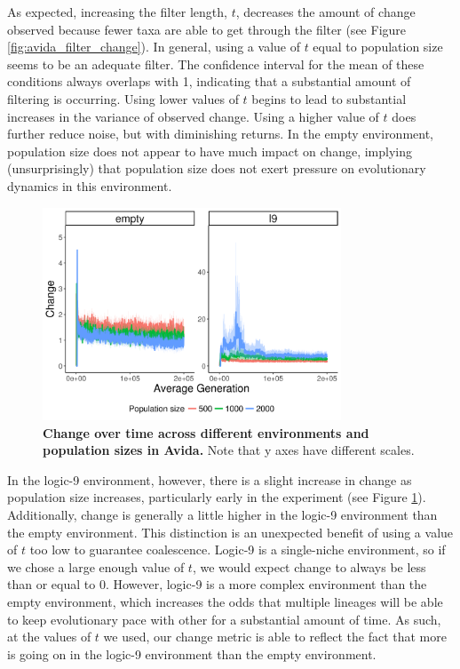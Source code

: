 \documentclass[letterpaper]{article}
\begin{document}
As expected, increasing the filter length, $t$, decreases the amount of change observed because fewer taxa are able to get through the filter (see Figure \ref{fig:avida_filter_change}). In general, using a value of $t$ equal to population size seems to be an adequate filter. The confidence interval for the mean of these conditions always overlaps with 1, indicating that a substantial amount of filtering is occurring. Using lower values of $t$ begins to lead to substantial increases in the variance of observed change. Using a higher value of $t$ does further reduce noise, but with diminishing returns. In the empty environment, population size does not appear to have much impact on change, implying (unsurprisingly) that population size does not exert pressure on evolutionary dynamics in this environment.

\begin{figure}
    \centering
    \includegraphics[width=3.5in]{figs/avida_env_change.png}
    \caption{\textbf{Change over time across different environments and population sizes in Avida.} Note that y axes have different scales.}
    \label{fig:avida_env_change}
\end{figure}

In the logic-9 environment, however, there is a slight increase in change as population size increases, particularly early in the experiment (see Figure \ref{fig:avida_env_change}). Additionally, change is generally a little higher in the logic-9 environment than the empty environment. This distinction is an unexpected benefit of using a value of $t$ too low to guarantee coalescence. Logic-9 is a single-niche environment, so if we chose a large enough value of $t$, we would expect change to always be less than or equal to 0. However, logic-9 is a more complex environment than the empty environment, which increases the odds that multiple lineages will be able to keep evolutionary pace with other for a substantial amount of time. As such, at the values of $t$ we used, our change metric is able to reflect the fact that more is going on in the logic-9 environment than the empty environment. 
\end{document}
